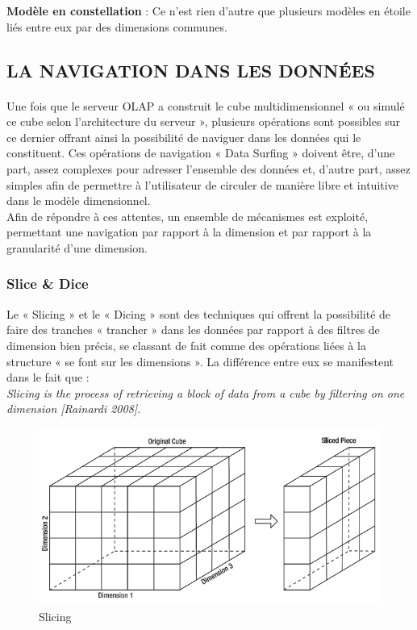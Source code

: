 \textbf{Modèle en constellation} : Ce n'est rien d'autre que plusieurs modèles en étoile liés entre eux par des dimensions communes.

  
  \subsection{LA NAVIGATION DANS LES DONNÉES}
  
  \paragraph{}
  Une fois que le serveur OLAP a construit le cube multidimensionnel « ou simulé ce cube selon l’architecture du serveur », plusieurs opérations sont possibles sur ce dernier offrant ainsi la possibilité de naviguer dans les données qui le constituent. Ces opérations de navigation « Data Surfing » doivent être, d’une part, assez complexes pour adresser l’ensemble des données et, d’autre part, assez simples afin de permettre à l’utilisateur de circuler de manière libre et intuitive dans le modèle dimensionnel.\\
  
Afin de répondre à ces attentes, un ensemble de mécanismes est exploité, permettant une navigation par rapport à la dimension et par rapport à la granularité d’une dimension.

  \subsubsection{Slice \& Dice}
  Le « Slicing » et le « Dicing » sont des techniques qui offrent la possibilité de faire des tranches « trancher » dans les données par rapport à des filtres de dimension bien précis, se classant de fait comme des opérations liées à la structure « se font sur les dimensions ». La différence entre eux se manifestent dans le fait que :\\
  
  \textit{Slicing is the process of retrieving a block of data from a cube by filtering on one dimension [Rainardi 2008].} 
   
   \begin{figure}[h]
	\begin{center}
		\includegraphics[scale=0.85]{images/slicing.png}
		\caption{Slicing}
		\label{slicing-image}
	\end{center}
   \end{figure}

